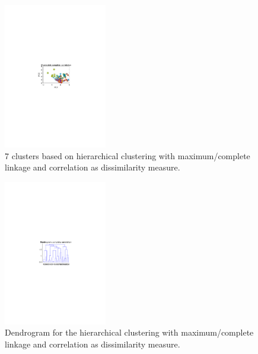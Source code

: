 \begin{multicols}{2}
\begin{figure}[H]
    \centering
    \includegraphics[width=0.4\textwidth]{fig/cluster_complete_cor.pdf}
    \caption{7 clusters based on hierarchical clustering with maximum/complete linkage and correlation as dissimilarity measure.}
    \label{fig:cluster_complete_cor}
\end{figure}

\begin{figure}[H]
    \centering
    \includegraphics[width=0.4\textwidth]{fig/dendro_complete_cor.pdf}
    \caption{Dendrogram for the hierarchical clustering with maximum/complete linkage and correlation as dissimilarity measure.}
    \label{fig:dendro_complete_cor}
\end{figure}

\end{multicols}

